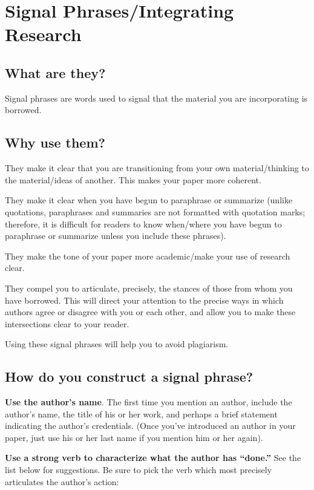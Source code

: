 \section{Signal Phrases/Integrating Research}
 
 
\subsection{What are they?}
 
Signal phrases are words used to signal that the material you are incorporating is 
borrowed.
 
\subsection {Why use them?}
 
They make it clear that you are transitioning from your own material/thinking to the 
material/ideas of another. This makes your paper more coherent.
 
They make it clear when you have begun to paraphrase or summarize (unlike quotations, 
paraphrases and summaries are not formatted with quotation marks; therefore, it is 
difficult for readers to know when/where you have begun to paraphrase or summarize 
unless you include these phrases).
 
They make the tone of your paper more academic/make your use of research clear.
 
They compel you to articulate, precisely, the stances of those from whom you have 
borrowed. This will direct your attention to the precise ways in which authors agree or 
disagree with you or each other, and allow you to make these intersections clear to 
your reader.
 
Using these signal phrases will help you to avoid plagiarism.
 
 
\subsection{How do you construct a signal phrase?}
 
\textbf{Use the author's name}. The first time you mention an author, include the 
author's name, the title of his or her work, and perhaps a brief statement indicating the 
author's credentials. (Once you've introduced an author in your paper, just use his or 
her last name if you mention him or her again).

\textbf{Use a strong verb to characterize what the author has “done.”} See the list 
below for suggestions. Be sure to pick the verb which most precisely articulates the 
author's action:
 
